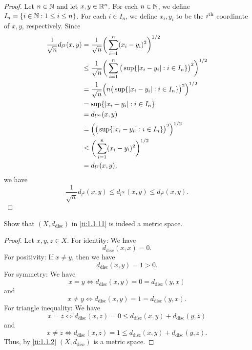 \begin{proof}
  Let \(n \in \mathbb{N}\) and let \(x, y \in \mathbb{R}^n\).
  For each \(n \in \mathbb{N}\), we define \(I_n = \left\lbrace i \in \mathbb{N} : 1 \leq i \leq n\right\rbrace\).
  For each \(i \in I_n\), we define \(x_i, y_i\) to be the \(i^{\operatorname{th}}\) coordinate of \(x, y\), respectively.
  Since
  \begin{align*}
    \dfrac{1}{\sqrt{n}} d_{l^2}(x, y) & = \dfrac{1}{\sqrt{n}} \bigg(\sum_{i = 1}^n (x_i - y_i)^2\bigg)^{1 / 2}                                         \\
                                      & \leq \dfrac{1}{\sqrt{n}} \bigg(\sum_{i = 1}^n \big(\sup \set{\abs{x_i - y_i} : i \in I_n}\big)^2\bigg)^{1 / 2} \\
                                      & = \dfrac{1}{\sqrt{n}} \Big(n \big(\sup \set{\abs{x_i - y_i} : i \in I_n}\big)^2\Big)^{1 / 2}                   \\
                                      & = \sup \set{\abs{x_i - y_i} : i \in I_n}                                                                       \\
                                      & = d_{l^\infty}(x, y)                                                                                           \\
                                      & = \Big(\big(\sup \set{\abs{x_i - y_i} : i \in I_n}\big)^2\Big)^{1 / 2}                                         \\
                                      & \leq \bigg(\sum_{i = 1}^n (x_i - y_i)^2\bigg)^{1 / 2}                                                          \\
                                      & = d_{l^2}(x, y),
  \end{align*}
  we have
  \[
    \dfrac{1}{\sqrt{n}} d_{l^2}(x, y) \leq d_{l^\infty}(x, y) \leq d_{l^2}(x, y).
  \]
\end{proof}

\begin{ex}\label{ii:ex:1.1.11}
  Show that \((X, d_{\text{disc}})\) in \cref{ii:1.1.11} is indeed a metric space.
\end{ex}

\begin{proof}
  Let \(x, y, z \in X\).
  For identity:
  We have
  \[
    d_{\text{disc}}(x, x) = 0.
  \]
  For positivity:
  If \(x \neq y\), then we have
  \[
    d_{\text{disc}}(x, y) = 1 > 0.
  \]
  For symmetry:
  We have
  \[
    x = y \iff d_{\text{disc}}(x, y) = 0 = d_{\text{disc}}(y, x)
  \]
  and
  \[
    x \neq y \iff d_{\text{disc}}(x, y) = 1 = d_{\text{disc}}(y, x).
  \]
  For triangle inequality:
  We have
  \[
    x = z \iff d_{\text{disc}}(x, z) = 0 \leq d_{\text{disc}}(x, y) + d_{\text{disc}}(y, z)
  \]
  and
  \[
    x \neq z \iff d_{\text{disc}}(x, z) = 1 \leq d_{\text{disc}}(x, y) + d_{\text{disc}}(y, z).
  \]
  Thus, by \cref{ii:1.1.2} \((X, d_{\text{disc}})\) is a metric space.
\end{proof}

